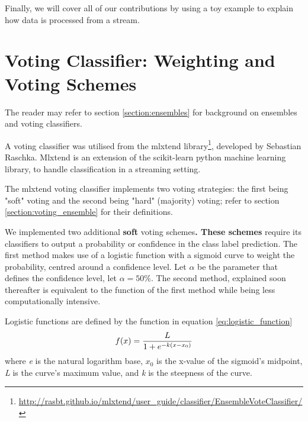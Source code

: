Finally, we will cover all of our contributions by using a toy example to explain how data is processed from a stream.


\section{Voting Classifier: Weighting and Voting Schemes \label{section:new_voting_strategy}}

The reader may refer to section \ref{section:ensembles} for background on ensembles and voting classifiers.

A voting classifier was utilised from the mlxtend library\footnote{\url{http://rasbt.github.io/mlxtend/user_guide/classifier/EnsembleVoteClassifier/}}, developed by Sebastian Raschka. Mlxtend is an extension of the scikit-learn python machine learning library, to handle classification in a streaming setting.

The mlxtend voting classifier implements two voting strategies: the first being "soft" voting and the second being "hard" (majority) voting; refer to section \ref{section:voting_ensemble} for their definitions.

We implemented two additional \textbf{soft} voting schemes\textbf{. These schemes} require its classifiers to output a probability or confidence in the class label prediction. The first method makes use of a logistic function with a sigmoid curve to weight the probability, centred around a  confidence level. Let $\alpha$ be the parameter that defines the confidence level, let $\alpha=50\%$. The second method, explained soon thereafter is equivalent to the function of the first method while being less computationally intensive.


Logistic functions are defined by the function in equation \ref{eq:logistic_function}
\begin{equation}
    f(x)=\frac{L}{1+e^{-k(x-x_0)}}\\ 
    \label{eq:logistic_function}
\end{equation}
where \textit{e} is the natural logarithm base, \textit{$x_0$} is the x-value of the sigmoid's midpoint, \textit{L} is the curve's maximum value, and \textit{k} is the steepness of the curve.

